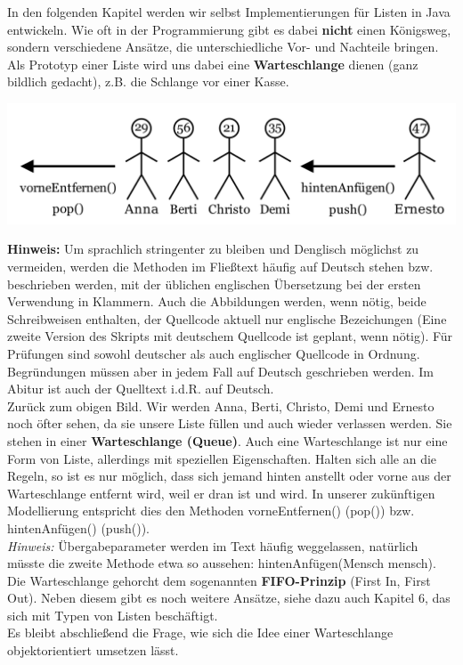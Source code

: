 \documentclass{article}
\begin{document}
In den folgenden Kapitel werden wir selbst Implementierungen für Listen in Java entwickeln. 
Wie oft in der Programmierung gibt es dabei \textbf{nicht} einen Königsweg, sondern
verschiedene Ansätze, die unterschiedliche Vor- und Nachteile bringen. \\
Als Prototyp einer Liste wird uns dabei eine \textbf{Warteschlange} dienen (ganz bildlich gedacht), z.B. die Schlange vor einer Kasse.
\begin{center}
    \includegraphics[scale=0.30]{../media/queue.png}
\end{center}
\textbf{Hinweis:} Um sprachlich stringenter zu bleiben und Denglisch möglichst zu vermeiden, werden die Methoden im Fließtext häufig auf Deutsch stehen bzw. beschrieben werden, mit der üblichen englischen Übersetzung bei der ersten Verwendung in Klammern. Auch die Abbildungen werden, wenn nötig, beide Schreibweisen enthalten, der Quellcode aktuell nur englische Bezeichungen (Eine zweite Version des Skripts mit deutschem Quellcode ist geplant, wenn nötig). Für Prüfungen sind sowohl deutscher als auch englischer Quellcode in Ordnung.
Begründungen müssen aber in jedem Fall auf Deutsch geschrieben werden. Im Abitur ist auch der Quelltext i.d.R. auf Deutsch. \\
Zurück zum obigen Bild. Wir werden Anna, Berti, Christo, Demi und Ernesto noch öfter sehen, da sie unsere Liste füllen und auch wieder verlassen werden. 
Sie stehen in einer \textbf{Warteschlange (Queue)}. Auch eine Warteschlange ist nur eine Form von Liste, allerdings mit speziellen Eigenschaften.
Halten sich alle an die Regeln, so ist es nur möglich, dass sich jemand hinten anstellt oder vorne aus der Warteschlange entfernt wird, weil er dran ist und  wird. In unserer zukünftigen Modellierung entspricht dies den Methoden vorneEntfernen() (pop()) bzw. hintenAnfügen() (push()). \\
\textit{Hinweis:} Übergabeparameter werden im Text häufig weggelassen, natürlich müsste die zweite Methode etwa so aussehen: hintenAnfügen(Mensch mensch).
Die Warteschlange gehorcht dem sogenannten \textbf{FIFO-Prinzip} (First In, First Out). Neben diesem gibt es noch weitere Ansätze, siehe dazu auch Kapitel 6, das sich mit Typen von Listen beschäftigt. \\
Es bleibt abschließend die Frage, wie sich die Idee einer Warteschlange objektorientiert umsetzen lässt.
\newpage
\end{document}
